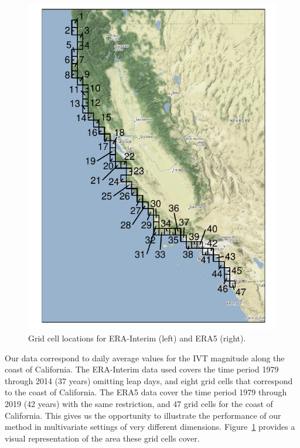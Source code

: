 \begin{figure}[tb]
\begin{minipage}{0.25\textwidth}
    \includegraphics[width=0.99\linewidth]{./images/era5_grid}
    \end{minipage}
    \caption{Grid cell locations for ERA-Interim (left) and ERA5 (right).\label{fig:gridlocs}}
\end{figure}

Our data correspond to daily average values for the IVT magnitude
    along the coast of California.  The ERA-Interim data used covers the time period 
    1979 through 2014 (37 years) omitting leap days, and eight grid cells that 
    correspond to the coast of California.  The ERA5 data cover the time period 
    1979 through 2019 (42 years) with the same restriction, and  47 grid cells for 
    the coast of California.  This gives us the opportunity to illustrate the 
    performance of our method in multivariate settings of very different dimensions. 
    Figure~\ref{fig:gridlocs} provides a visual representation of the area these grid 
    cells cover.

